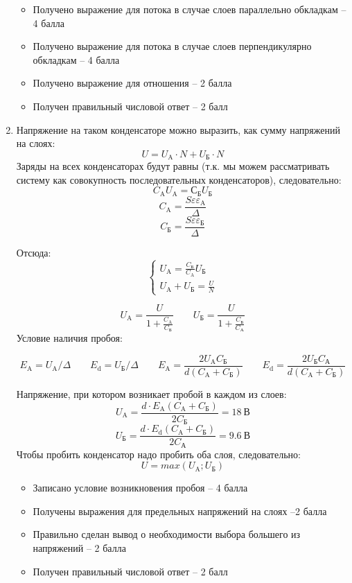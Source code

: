 \begin{enumerate}

    \markSection
    \begin{itemize}
        \item Получено выражение для потока  в случае слоев параллельно обкладкам – 4 балла
        \item Получено выражение для потока  в случае слоев перпендикулярно обкладкам – 4 балла
        \item Получено выражение для отношения – 2 балла
        \item Получен правильный числовой ответ – 2 балл
    \end{itemize}

    \item Напряжение на таком конденсаторе можно выразить, как  сумму напряжений на слоях:
    $$U = U_\text{A} \cdot N + U_\text{Б} \cdot N$$
    Заряды на всех конденсаторах будут равны (т.к. мы можем рассматривать систему как совокупность последовательных конденсаторов), следовательно:
    $$C_\text{A}U_\text{A} = С_\text{Б}U_\text{Б}$$
    $$C_\text{A}=\frac{S\varepsilon \varepsilon_\text{A}}{\Delta}$$ 
    $$C_\text{Б}=\frac{S\varepsilon \varepsilon_\text{Б}}{\Delta}$$ 

    Отсюда:
    $$ \left\{
        \begin{aligned}
            U_\text{A}=\frac{C_\text{Б}}{C_\text{A}}U_\text{Б} \\
            U_\text{A}+U_\text{Б}=\frac{U}{N}
        \end{aligned}
    \right. $$

    $$U_\text{A}=\frac{U}{1+\frac{C_\text{A}}{C_\text{Б}}} \qquad U_\text{Б}=\frac{U}{1+\frac{C_\text{Б}}{C_\text{А}}}$$
    Условие наличия пробоя: 

    $$E_\text{A} = U_\text{A}/\Delta \qquad E_\text{d} = U_\text{Б}/\Delta \qquad E_\text{A}=\frac{2U_\text{A} C_\text{Б}}{d(C_\text{A}+C_\text{Б})} \qquad E_\text{d}=\frac{2U_\text{Б} C_\text{А}}{d(C_\text{A}+C_\text{Б})}$$
    
    Напряжение, при котором возникает пробой в каждом из слоев:
    $$U_\text{A}=\frac{d \cdot E_\text{A} (C_\text{A}+C_\text{Б})}{2C_\text{Б}}=18 \: \text{В}$$
    $$U_\text{Б}=\frac{d \cdot E_\text{d} (C_\text{A}+C_\text{Б})}{2C_\text{А}}=9.6 \: \text{В}$$
    Чтобы пробить конденсатор надо пробить оба слоя, следовательно:
    $$U=max(U_\text{A};U_\text{Б})$$

    \begin{itemize}
        \item Записано условие возникновения пробоя – 4 балла
        \item Получены выражения для предельных напряжений на слоях –2 балла
        \item Правильно сделан вывод о необходимости выбора большего из напряжений – 2 балла
        \item Получен правильный числовой ответ – 2 балл
    \end{itemize}
\end{enumerate}
